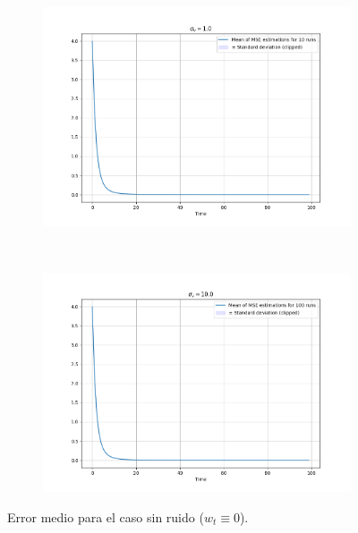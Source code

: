 \documentclass[11pt,a4paper]{article}
\begin{document}
\begin{figure}[h!]
    \centering
    \begin{subfigure}{\textwidth}
        \centering
        \includegraphics[width=.8\textwidth]{img/error_0noise}
    \end{subfigure}\\
    \begin{subfigure}{\textwidth}
        \centering
        \includegraphics[width=.8\textwidth]{img/error_0noise_s10}
    \end{subfigure}
    \caption{Error medio para el caso sin ruido ($w_t\equiv 0$).}
    \label{fig:error0}
\end{figure}
\end{document}
